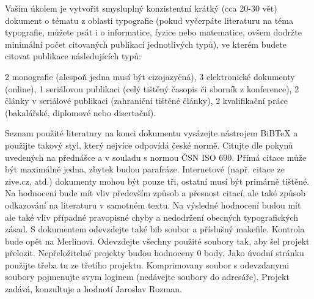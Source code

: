 \documentclass[11pt]{article}
\begin{document}
    Vaším úkolem je vytvořit smysluplný konzistentní krátký (cca 20-30 vět) dokument o tématu z oblasti typografie (pokud vyčerpáte literaturu na téma typografie, můžete psát i o informatice, fyzice nebo matematice, ovšem dodržte minimální počet citovaných publikací jednotlivých typů), ve kterém budete citovat publikace následujících typů:

    2 monografie (alespoň jedna musí být cizojazyčná),
    3 elektronické dokumenty (online),
    1 seriálovou publikaci (celý tištěný časopis či sborník z konference),
    2 články v seriálové publikaci (zahraniční tištěné články),
    2 kvalifikační práce (bakalářské, diplomové nebo disertační).

    Seznam použité literatury na konci dokumentu vysázejte nástrojem BiBTeX a použijte takový styl, který nejvíce odpovídá české normě. Citujte dle pokynů uvedených na přednášce a v souladu s normou ČSN ISO 690. Přímá citace může být maximálně jedna, zbytek budou parafráze. Internetové (např. citace ze zive.cz, atd.) dokumenty mohou být pouze tři, ostatní musí být primárně tištěné. Na hodnocení bude mít vliv především způsob a přesnost citací, ale také způsob odkazování na literaturu v samotném textu. Na výsledné hodnocení budou mít ale také vliv případné pravopisné chyby a nedodržení obecných typografických zásad. S dokumentem odevzdejte také bib soubor a příslušný makefile. Kontrola bude opět na Merlinovi. Odevzdejte všechny použité soubory tak, aby šel projekt přelozit. Nepřeložitelné projekty budou hodnoceny 0 body. Jako úvodní stránku použijte třeba tu ze třetího projektu. Komprimovany soubor s odevzdanymi soubory pojmenujte svym loginem (nedávejte soubory do adresáře). Projekt zadává, konzultuje a hodnotí Jaroslav Rozman.
\end{document}
